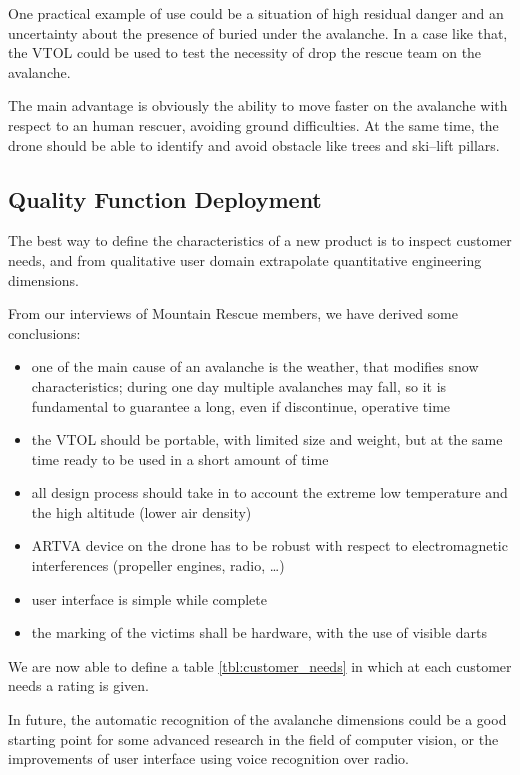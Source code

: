 One practical example of use could be a situation of high residual danger and an uncertainty about the presence of buried under the avalanche. In a case like that, the VTOL could be used to test the necessity of drop the rescue team on the avalanche.

The main advantage is obviously the ability to move faster on the avalanche with respect to an human rescuer, avoiding ground difficulties. At the same time, the drone should be able to identify and avoid obstacle like trees and ski--lift pillars.

\subsection{Quality Function Deployment}
The best way to define the characteristics of a new product is to inspect customer needs, and from qualitative user domain extrapolate quantitative engineering dimensions\cite{akao1994development}.

From our interviews of Mountain Rescue members, we have derived some conclusions:
\begin{itemize}
\item one of the main cause of an avalanche is the weather, that modifies snow characteristics; during one day multiple avalanches may fall, so it is fundamental to guarantee a long, even if discontinue, operative time
\item the VTOL should be portable, with limited size and weight, but at the same time ready to be used in a short amount of time
\item all design process should take in to account the extreme low temperature and the high altitude (lower air density)
\item ARTVA device on the drone has to be robust with respect to electromagnetic interferences (propeller engines, radio, \dots)
\item user interface is simple while complete
\item the marking of the victims shall be hardware, with the use of visible darts
\end{itemize}


We are now able to define a table \ref{tbl:customer_needs} in which at each customer needs a rating is given.

In future, the automatic recognition of the avalanche dimensions could be a good starting point for some advanced research in the field of computer vision, or the improvements of user interface using voice recognition over radio.

